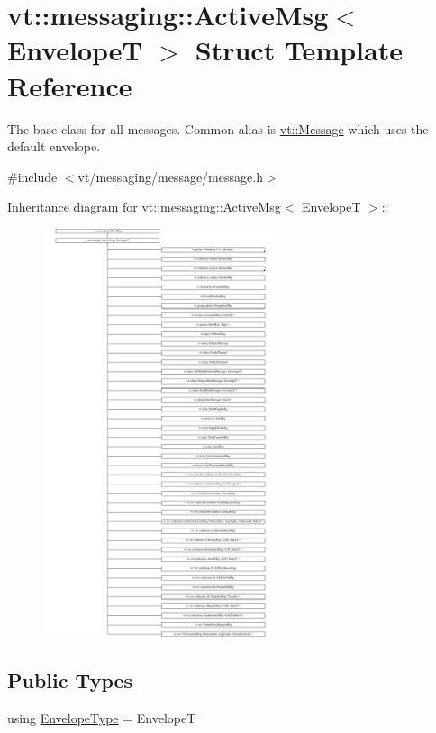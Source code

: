 \hypertarget{structvt_1_1messaging_1_1_active_msg}{}\section{vt\+:\+:messaging\+:\+:Active\+Msg$<$ EnvelopeT $>$ Struct Template Reference}
\label{structvt_1_1messaging_1_1_active_msg}


The base class for all messages. Common alias is {\ttfamily \hyperlink{namespacevt_a3a3ddfef40b4c90915fa43cdd5f129ea}{vt\+::\+Message}} which uses the default envelope.  




{\ttfamily \#include $<$vt/messaging/message/message.\+h$>$}

Inheritance diagram for vt\+:\+:messaging\+:\+:Active\+Msg$<$ EnvelopeT $>$\+:\begin{figure}[H]
\begin{center}
\leavevmode
\includegraphics[height=12.000000cm]{structvt_1_1messaging_1_1_active_msg}
\end{center}
\end{figure}
\subsection*{Public Types}
\begin{DoxyCompactItemize}
\item 
using \hyperlink{structvt_1_1messaging_1_1_active_msg_a6e2b0541c25f7290555bf50d7cc05874}{Envelope\+Type} = EnvelopeT
\end{DoxyCompactItemize}
